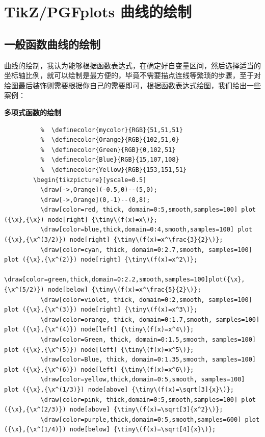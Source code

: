 \clearpage
 \section{TikZ/PGFplots 曲线的绘制}
 \thispagestyle{empty}
 \subsection{一般函数曲线的绘制}

 曲线的绘制，我认为能够根据函数表达式，在确定好自变量区间，然后选择适当的坐标轴比例，就可以绘制是最方便的，毕竟不需要描点连线等繁琐的步骤，至于对绘图最后装饰则需要根据你自己的需要即可，根据函数表达式绘图，我们给出一些案例：

 \textbf{多项式函数的绘制}

 \begin{lstlisting}[gobble=8]
          %  \definecolor{myback}{RGB}{53,64,89}
          %  \definecolor{mycolor}{RGB}{51,51,51}
          %  \definecolor{Orange}{RGB}{102,51,0}
          %  \definecolor{Green}{RGB}{0,102,51}
          %  \definecolor{Blue}{RGB}{15,107,108}
          %  \definecolor{Yellow}{RGB}{153,151,51}
        \begin{tikzpicture}[yscale=0.5]
          \draw[->,Orange](-0.5,0)--(5,0);
          \draw[->,Orange](0,-1)--(0,8);
          \draw[color=red, thick, domain=0:5,smooth,samples=100] plot ({\x},{\x}) node[right] {\tiny\(f(x)=x\)};
          \draw[color=blue,thick,domain=0:4,smooth,samples=100] plot ({\x},{\x^(3/2)}) node[right] {\tiny\(f(x)=x^\frac{3}{2}\)};
          \draw[color=cyan, thick, domain=0:2.7,smooth, samples=100] plot ({\x},{\x^(2)}) node[right] {\tiny\(f(x)=x^2\)};
          \draw[color=green,thick,domain=0:2.2,smooth,samples=100]plot({\x},{\x^(5/2)}) node[below] {\tiny\(f(x)=x^\frac{5}{2}\)};
          \draw[color=violet, thick, domain=0:2,smooth, samples=100] plot ({\x},{\x^(3)}) node[right] {\tiny\(f(x)=x^3\)};
          \draw[color=orange, thick, domain=0:1.7,smooth, samples=100] plot ({\x},{\x^(4)}) node[left] {\tiny\(f(x)=x^4\)};
          \draw[color=Green, thick, domain=0:1.5,smooth, samples=100] plot ({\x},{\x^(5)}) node[left] {\tiny\(f(x)=x^5\)};
          \draw[color=Blue, thick, domain=0:1.35,smooth, samples=100] plot ({\x},{\x^(6)}) node[left] {\tiny\(f(x)=x^6\)};
          \draw[color=yellow,thick,domain=0:5,smooth, samples=100] plot ({\x},{\x^(1/3)}) node[above] {\tiny\(f(x)=\sqrt[3]{x}\)};
          \draw[color=pink, thick,domain=0:5,smooth,samples=100] plot ({\x},{\x^(2/3)}) node[above] {\tiny\(f(x)=\sqrt[3]{x^2}\)};
          \draw[color=purple,thick,domain=0:5,smooth,samples=600] plot ({\x},{\x^(1/4)}) node[below] {\tiny\(f(x)=\sqrt[4]{x}\)};

\end{lstlisting}
